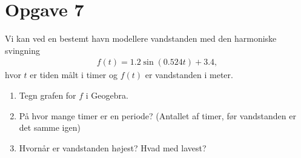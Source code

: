 \section*{Opgave 7}
Vi kan ved en bestemt havn modellere vandstanden med den harmoniske svingning
\begin{align*}
f(t) = 1.2\sin(0.524t) + 3.4,
\end{align*}
hvor $t$ er tiden målt i timer og $f(t)$ er vandstanden i meter. 
\begin{enumerate}[label=\roman*)]
\item Tegn grafen for $f$ i Geogebra. 
\item På hvor mange timer er en periode? (Antallet af timer, før vandstanden er det samme igen)
\item Hvornår er vandstanden højest? Hvad med lavest?
\end{enumerate}


